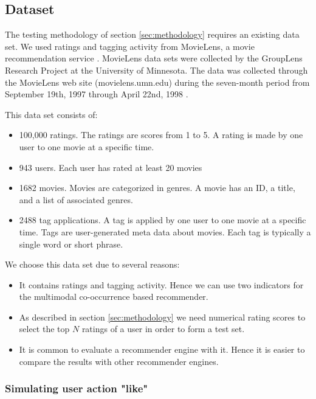 \subsection{Dataset}
\label{sec:dataset}

The testing methodology of section \ref{sec:methodology} requires an existing data set. We used ratings and tagging activity from MovieLens, a movie recommendation service \cite{movielensdata}.
MovieLens data sets were collected by the GroupLens Research Project at the University of Minnesota. The data was collected through the MovieLens web site (movielens.umn.edu) during the seven-month period from September 19th, 1997 through April 22nd, 1998 \cite{movielensdata}.

This data set consists of:
\begin{itemize}
\item 100,000 ratings. The ratings are scores from 1 to 5. A rating is made by one user to one movie at a specific time. 

\item 943 users. Each user has rated at least 20 movies
\item 1682 movies. Movies are categorized in genres. A movie has an ID, a title, and a list of associated genres. 
\item 2488 \gls{tag} applications. A \gls{tag} is applied by one user to one movie at a specific time. Tags are user-generated meta data about movies. Each tag is typically a single word or short phrase. 
\end{itemize}
 
We choose this data set due to several reasons:
\begin{itemize}
\item It contains ratings and tagging activity. Hence we can use two indicators for the multimodal co-occurrence based recommender.
\item As described in section \ref{sec:methodology} we need numerical rating scores to select the top $N$ ratings of a user in order to form a test set. 
\item  It is common to evaluate a recommender engine with it. Hence it is easier to compare the results with other recommender engines. 
\end{itemize}


\subsubsection{Simulating user action "like"}

